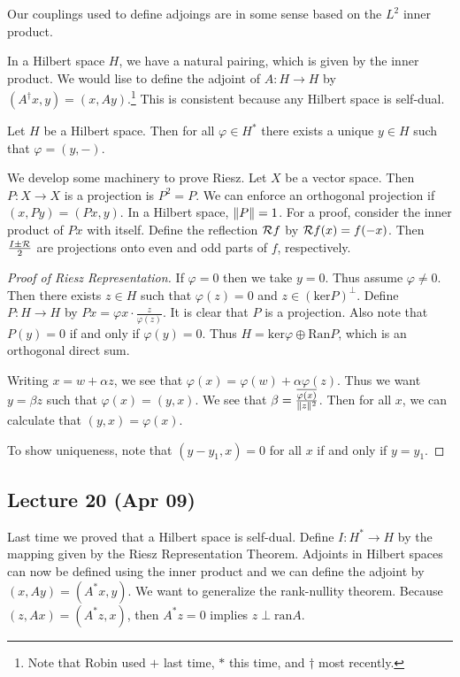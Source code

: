 \documentclass[10pt, twoside]{article}
\begin{document}
    \begin{rmk} Our couplings used to define adjoings are in some sense based
    on the $L^2$ inner product.  \end{rmk}

    In a Hilbert space $H$, we have a natural pairing, which is given by the
    inner product. We would lise to define the adjoint of $A:H \to H$ by
    $(A^{\dag}x,y) = (x,Ay)$.\footnote{Note that Robin used $+$ last time, $*$
    this time, and $\dag$ most recently.} This is consistent because any
    Hilbert space is self-dual.

    \begin{thm} Let $H$ be a Hilbert space. Then
    for all $\varphi \in H^*$ there exists a unique $y \in H$ such that
$\varphi = (y,-)$.  \end{thm}

    We develop some machinery to prove Riesz. Let $X$ be a vector space. Then
    $P:X \to X$ is a projection is $P^2=P$. We can enforce an orthogonal
    projection if $(x,Py) = (Px,y)$. In a Hilbert space, $\lVert P\rVert = 1$. For a
    proof, consider the inner product of $Px$ with itself. Define the
    reflection $\mathcal{R}f$ by $\mathcal{R}f(x) = f(-x)$. Then $\frac{I\pm\mathcal{R}}{2}$
    are projections onto even and odd parts of $f$, respectively.

    \begin{proof}[Proof of Riesz Representation] If $\varphi = 0$ then we take
        $y=0$. Thus assume $\varphi \neq 0$. Then there exists $z \in H$ such
        that $\varphi(z)=0$ and $z \in (\mathrm{ker}P)^{\perp}$. Define $P:H
        \to H$ by $Px = \varphi{x} \cdot \frac{z}{\varphi(z)}$. It is clear
        that $P$ is a projection. Also note that $P(y) = 0$ if and only if
        $\varphi(y) = 0$. Thus $H = \mathrm{ker} \varphi \oplus \mathrm{Ran}
        P$, which is an orthogonal direct sum.

        Writing $x=w+\alpha z$, we see that $\varphi(x) = \varphi(w) + \alpha
        \varphi(z)$. Thus we want $y=\beta z$ such that $\varphi(x) = (y,x)$.
        We see that $\beta = \frac{\overline{\varphi(x)}}{\lVert z\rVert^2}$. Then
        for all $x$, we can calculate that $(y,x) = \varphi(x)$.

        To show uniqueness, note that $(y-y_1,x) = 0$ for all $x$ if and only
    if $y=y_1$.  \end{proof}

    \subsection{Lecture 20 (Apr 09)} Last time we proved that a Hilbert space
    is self-dual. Define $I: H^* \to H$ by the mapping given by the Riesz
    Representation Theorem. Adjoints in Hilbert spaces can now be defined using
    the inner product and we can define the adjoint by $(x,Ay) = (A^*x,y)$. We
    want to generalize the rank-nullity theorem. Because $(z,Ax) = (A^*z,x)$,
    then $A^*z = 0$ implies $z \perp \mathrm{ran} A$.
\end{document}
